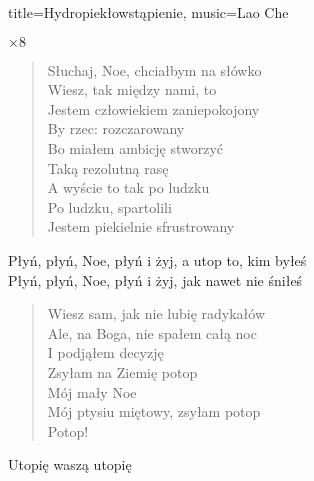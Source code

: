 \newpage
\begin{song}{title={Hydropiekłowstąpienie}, music={Lao Che}}
\small
\begin{multicols}{2}
    \begin{intro}
           
    \end{intro}
    \begin{riff}
            $\times 8$
    \end{riff}
    \begin{verse}
        Słuchaj, Noe, chciałbym na słówko \smallskip \\
        Wiesz, tak między nami, to \\
        Jestem człowiekiem zaniepokojony \\
        By rzec: rozczarowany \smallskip \\
        Bo miałem ambicję stworzyć \\
        Taką rezolutną rasę \smallskip \\
        A wyście to tak po ludzku \\
        Po ludzku, spartolili \smallskip \\
        Jestem piekielnie sfrustrowany
    \end{verse}
    \begin{interlude}
        Płyń, płyń, Noe, płyń i żyj, a utop to, kim byłeś \\
        Płyń, płyń, Noe, płyń i żyj, jak nawet nie śniłeś
    \end{interlude}
    \begin{verse}
        Wiesz sam, jak nie lubię radykałów \smallskip \\
        Ale, na Boga, nie spałem całą noc \\
        I podjąłem decyzję \smallskip \\
        Zsyłam na Ziemię potop \\
        Mój mały Noe \smallskip \\
        Mój ptysiu miętowy, zsyłam potop \\
        Potop!
    \end{verse}
    \begin{riff}
            
    \end{riff}
    \begin{chorus}
        Utopię waszą utopię \\

\end{chorus}
\end{multicols}
\end{song}
